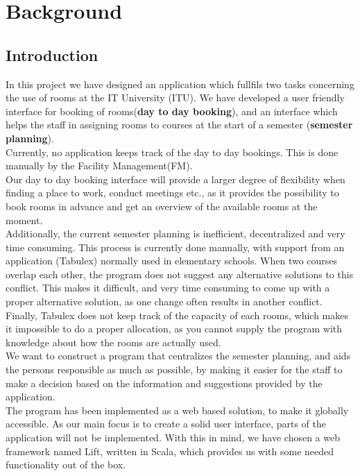 \chapter{Background}
\section{Introduction}
In this project we have designed an application which fullfils two tasks concerning the use of rooms at the IT University (ITU). We have developed a user friendly interface for booking of rooms(\textbf{day to day booking}), and an interface which helps the staff in assigning rooms to courses at the start of a semester (\textbf{semester planning}).\\

Currently, no application keeps track of the day to day bookings. This is done manually by the Facility Management(FM).\\
Our day to day booking interface will provide a larger degree of flexibility when finding a place to work, conduct meetings etc., as it provides the possibility to book rooms in advance and get an overview of the available rooms at the moment.\\

 Additionally, the current semester planning is inefficient, decentralized and very time consuming. This process is currently done manually, with support from an application (Tabulex\cite{tabulex}) normally used in elementary schools. When two courses overlap each other, the program does not suggest any alternative solutions to this conflict. This makes it difficult, and very time consuming to come up with a proper alternative solution, as one change often results in another conflict.\\
Finally, Tabulex does not keep track of the capacity of each rooms, which makes it impossible to do a proper allocation, as you cannot supply the program with knowledge about how the rooms are actually used.\\
We want to construct a program that centralizes the semester planning, and aids the persons responsible as much as possible, by making it easier for the staff to make a decision based on the information and suggestions provided by the application. \\

The program has been implemented as a web based solution, to make it globally accessible. As our main focus is to create a solid user interface, parts of the application will not be implemented. With this in mind, we have chosen a web framework named Lift, written in Scala, which provides us with some needed functionality out of the box.

